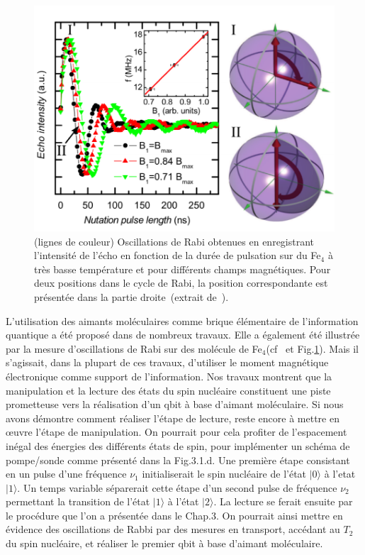 \begin{figure}[h!]
\parbox{7cm}{
\includegraphics[scale=0.45]{Conclusion/OscilFe4/OscilFe4.pdf} 
}
\parbox{6.5cm}{\caption{(lignes de couleur) Oscillations de Rabi obtenues en enregistrant l'intensité de l'écho en fonction de la durée de pulsation sur du Fe$_4$ à très basse température et pour différents champs magnétiques. Pour deux positions dans le cycle de Rabi, la position correspondante est présentée dans la partie droite~(extrait de~\cite{Schlegel2008}).}
\label{OscilFe4}
}
\end{figure}

L'utilisation des aimants moléculaires comme brique élémentaire de l'information quantique a été proposé dans de nombreux travaux. Elle a également été illustrée par la mesure d'oscillations de Rabi sur des molécule de Fe$_{4}$(cf~\cite{Schlegel2008} et Fig.\ref{OscilFe4}). Mais il s'agissait, dans la plupart de ces travaux, d'utiliser le moment magnétique électronique comme support de l'information. Nos travaux montrent que la manipulation et la lecture des états du spin nucléaire constituent une piste prometteuse vers la réalisation d'un qbit à base d'aimant moléculaire. Si nous avons démontre comment réaliser l’étape de lecture, reste encore à mettre en œuvre l’étape de manipulation. On pourrait pour cela profiter de l'espacement inégal des énergies des différents états de spin, pour implémenter un schéma de pompe/sonde comme présenté dans la Fig.3.1.d. Une première étape consistant en un pulse d'une fréquence $\nu_1$ initialiserait le spin nucléaire de l’état $|0\rangle$ à l'etat $|1\rangle$. Un temps variable séparerait cette étape d'un second pulse de fréquence $\nu_2$ permettant la transition de l’état $|1\rangle$ à l’état $|2\rangle$. La lecture se ferait ensuite par le procédure que l'on a présentée dans le Chap.3. On pourrait ainsi mettre en évidence des oscillations de Rabbi par des mesures en transport, accédant au $T_2$ du spin nucléaire, et réaliser le premier qbit à base d'aimant moléculaire.


